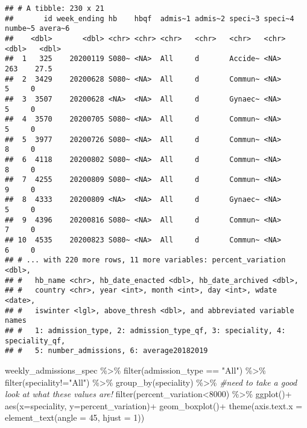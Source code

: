 \documentclass[
]{article}
\newenvironment{Shaded}{\begin{snugshade}}{\end{snugshade}}
\newcommand{\AttributeTok}[1]{\textcolor[rgb]{0.77,0.63,0.00}{#1}}
\newcommand{\CommentTok}[1]{\textcolor[rgb]{0.56,0.35,0.01}{\textit{#1}}}
\newcommand{\DecValTok}[1]{\textcolor[rgb]{0.00,0.00,0.81}{#1}}
\newcommand{\FunctionTok}[1]{\textcolor[rgb]{0.00,0.00,0.00}{#1}}
\newcommand{\NormalTok}[1]{#1}
\newcommand{\SpecialCharTok}[1]{\textcolor[rgb]{0.00,0.00,0.00}{#1}}
\newcommand{\StringTok}[1]{\textcolor[rgb]{0.31,0.60,0.02}{#1}}
\begin{document}
\begin{verbatim}
## # A tibble: 230 x 21
##       id week_ending hb    hbqf  admis~1 admis~2 speci~3 speci~4 numbe~5 avera~6
##    <dbl>       <dbl> <chr> <chr> <chr>   <chr>   <chr>   <chr>     <dbl>   <dbl>
##  1   325    20200119 S080~ <NA>  All     d       Accide~ <NA>        263    27.5
##  2  3429    20200628 S080~ <NA>  All     d       Commun~ <NA>          5     0  
##  3  3507    20200628 <NA>  <NA>  All     d       Gynaec~ <NA>          5     0  
##  4  3570    20200705 S080~ <NA>  All     d       Commun~ <NA>          5     0  
##  5  3977    20200726 S080~ <NA>  All     d       Commun~ <NA>          8     0  
##  6  4118    20200802 S080~ <NA>  All     d       Commun~ <NA>          8     0  
##  7  4255    20200809 S080~ <NA>  All     d       Commun~ <NA>          9     0  
##  8  4333    20200809 <NA>  <NA>  All     d       Gynaec~ <NA>          5     0  
##  9  4396    20200816 S080~ <NA>  All     d       Commun~ <NA>          7     0  
## 10  4535    20200823 S080~ <NA>  All     d       Commun~ <NA>          6     0  
## # ... with 220 more rows, 11 more variables: percent_variation <dbl>,
## #   hb_name <chr>, hb_date_enacted <dbl>, hb_date_archived <dbl>,
## #   country <chr>, year <int>, month <int>, day <int>, wdate <date>,
## #   iswinter <lgl>, above_thresh <dbl>, and abbreviated variable names
## #   1: admission_type, 2: admission_type_qf, 3: speciality, 4: speciality_qf,
## #   5: number_admissions, 6: average20182019
\end{verbatim}

\begin{Shaded}
\begin{Highlighting}[]
\NormalTok{weekly\_admissions\_spec }\SpecialCharTok{\%\textgreater{}\%} 
  \FunctionTok{filter}\NormalTok{(admission\_type }\SpecialCharTok{==} \StringTok{"All"}\NormalTok{) }\SpecialCharTok{\%\textgreater{}\%} 
  \FunctionTok{filter}\NormalTok{(speciality}\SpecialCharTok{!=}\StringTok{"All"}\NormalTok{) }\SpecialCharTok{\%\textgreater{}\%} 
  \FunctionTok{group\_by}\NormalTok{(speciality) }\SpecialCharTok{\%\textgreater{}\%} 
  \CommentTok{\#need to take a good look at what these values are!}
  \FunctionTok{filter}\NormalTok{(percent\_variation}\SpecialCharTok{\textless{}}\DecValTok{8000}\NormalTok{) }\SpecialCharTok{\%\textgreater{}\%} 
  \FunctionTok{ggplot}\NormalTok{()}\SpecialCharTok{+}
  \FunctionTok{aes}\NormalTok{(}\AttributeTok{x=}\NormalTok{speciality, }\AttributeTok{y=}\NormalTok{percent\_variation)}\SpecialCharTok{+}
  \FunctionTok{geom\_boxplot}\NormalTok{()}\SpecialCharTok{+}
  \FunctionTok{theme}\NormalTok{(}\AttributeTok{axis.text.x =} \FunctionTok{element\_text}\NormalTok{(}\AttributeTok{angle =} \DecValTok{45}\NormalTok{, }\AttributeTok{hjust =} \DecValTok{1}\NormalTok{))}
\end{Highlighting}
\end{Shaded}
\end{document}
